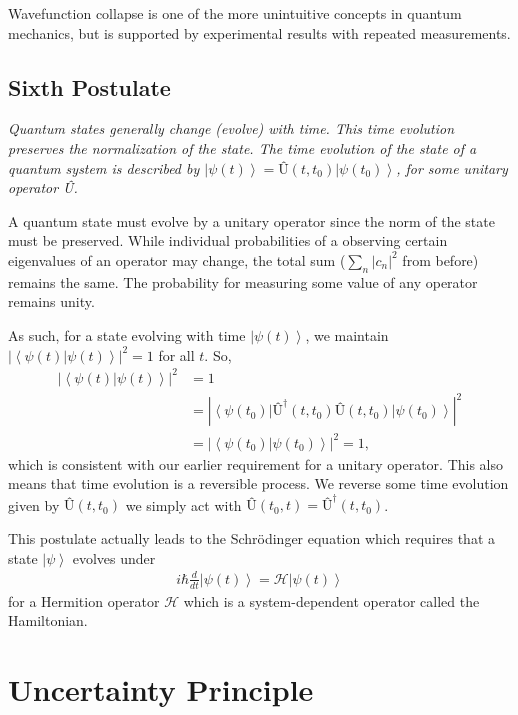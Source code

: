 \documentclass[11pt]{article} %
\newcommand{\bra}[1]{\left\langle #1 \right|}
\newcommand{\ket}[1]{\left|#1\right\rangle}
\newcommand{\braket}[2]{\left\langle#1 |  #2\right\rangle}
\begin{document}
Wavefunction collapse is one of the more unintuitive concepts in quantum mechanics, but is supported by experimental results with repeated measurements.

\subsection{Sixth Postulate}
\begin{center}
    \textit{Quantum states generally change (evolve) with time. This time evolution preserves the normalization of the state. The time evolution of the state of a quantum system is described by $\ket{\psi(t)} = \textbf{\^U}(t,t_0)\ket{\psi(t_0)}$, for some unitary operator \^U.}
\end{center}

A quantum state must evolve by a unitary operator since the norm of the state must be preserved. While individual probabilities of a observing certain eigenvalues of an operator may change, the total sum ($\sum_n\left|c_n\right|^2$ from before) remains the same. The probability for measuring some value of any operator remains unity.

As such, for a state evolving with time $\ket{\psi(t)}$, we maintain $\left|\braket{\psi(t)}{\psi(t)}\right|^2 = 1$ for all $t$. So,
\begin{align}
    \left|\braket{\psi(t)}{\psi(t)}\right|^2 &= 1\\
    &= \left|\bra{\psi(t_0)}\textbf{\^U}^\dagger(t,t_0)\textbf{\^U}(t,t_0)\ket{\psi(t_0)}\right|^2\nonumber\\
    &= \left|\braket{\psi(t_0)}{\psi(t_0)}\right|^2 = 1,
\end{align}
which is consistent with our earlier requirement for a unitary operator. This also means that time evolution is a reversible process. We reverse some time evolution given by $\textbf{\^U}(t,t_0)$ we simply act with $\textbf{\^U}(t_0,t) = \textbf{\^U}^\dagger(t,t_0)$.

This postulate actually leads to the Schr\"odinger equation which requires that a state $\ket{\psi}$ evolves under
\begin{align}
    i\hbar\frac{d}{dt}\ket{\psi(t)} = \mathcal{H}\ket{\psi(t)}
\end{align}
for a Hermition operator $\mathcal{H}$ which is a system-dependent operator called the Hamiltonian.

\section{Uncertainty Principle}
\end{document}
